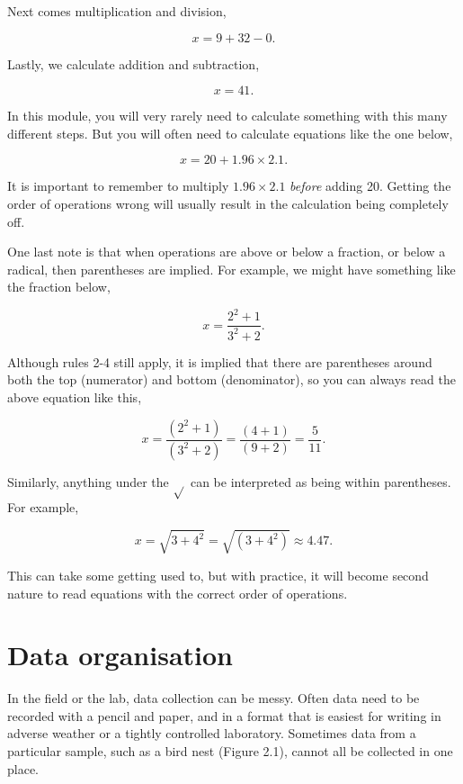 \documentclass[
]{scrbook}
\begin{document}
Next comes multiplication and division,

\[x = 9 + 32 -  0.\]

Lastly, we calculate addition and subtraction,

\[x = 41.\]

In this module, you will very rarely need to calculate something with this many different steps.
But you will often need to calculate equations like the one below,

\[x = 20 + 1.96 \times 2.1.\]

It is important to remember to multiply \(1.96 \times 2.1\) \emph{before} adding 20.
Getting the order of operations wrong will usually result in the calculation being completely off.

One last note is that when operations are above or below a fraction, or below a radical, then parentheses are implied.
For example, we might have something like the fraction below,

\[x = \frac{2^{2} + 1}{3^{2} +2}.\]

Although rules 2-4 still apply, it is implied that there are parentheses around both the top (numerator) and bottom (denominator), so you can always read the above equation like this,

\[x = \frac{\left(2^{2} + 1\right)}{\left(3^{2} + 2\right)} = \frac{\left(4 + 1\right)}{\left(9 + 2\right)} = \frac{5}{11}.\]

Similarly, anything under the \(\sqrt{}\) can be interpreted as being within parentheses.
For example,

\[x = \sqrt{3 + 4^{2}} = \sqrt{\left(3 + 4^{2} \right)} \approx 4.47.\]

This can take some getting used to, but with practice, it will become second nature to read equations with the correct order of operations.

\hypertarget{Chapter_2}{%
\chapter{Data organisation}\label{Chapter_2}}

In the field or the lab, data collection can be messy.
Often data need to be recorded with a pencil and paper, and in a format that is easiest for writing in adverse weather or a tightly controlled laboratory.
Sometimes data from a particular sample, such as a bird nest (Figure 2.1), cannot all be collected in one place.
\end{document}
